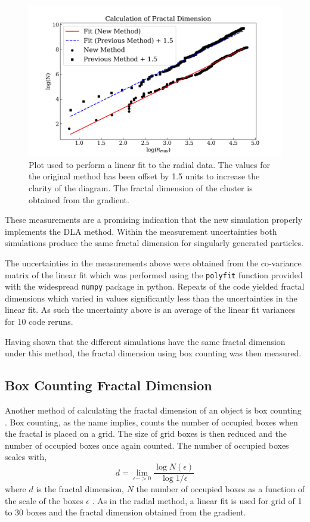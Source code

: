 \documentclass[%
 aapm,
 mph,%
 amsmath,amssymb,
 reprint,%
]{revtex4-2}
\begin{document}
\begin{figure}[h]
\centering
\includegraphics[width=\linewidth]{figures/1.png}
\caption{\label{fig:radial_dimension}Plot used to perform a linear fit to the radial data. The values for the original method has been offset by 1.5 units to increase the clarity of the diagram. The fractal dimension of the cluster is obtained from the gradient.}
\end{figure}
These measurements are a promising indication that the new simulation properly implements the DLA method. Within the measurement uncertainties both simulations produce the same fractal dimension for singularly generated particles.

The uncertainties in the measurements above were obtained from the co-variance matrix of the linear fit which was performed using the \verb+polyfit+ function provided with the widespread \verb+numpy+ package in python. Repeats of the code yielded fractal dimensions which varied in values significantly less than the uncertainties in the linear fit. As such the uncertainty above is an average of the linear fit variances for 10 code reruns.

Having shown that the different simulations have the same fractal dimension under this method, the fractal dimension using box counting was then measured.
\subsection{\label{sec:box_counting}Box Counting Fractal Dimension}
Another method of calculating the fractal dimension of an object is box counting \cite{FractalsBook}. Box counting, as the name implies, counts the number of occupied boxes when the fractal is placed on a grid. The size of grid boxes is then reduced and the number of occupied boxes once again counted. The number of occupied boxes scales with,
\begin{equation}
d = \lim_{\epsilon->0} \frac{ \log N(\epsilon) }{ \log 1/\epsilon }
\end{equation}
where $d$ is the fractal dimension, $N$ the number of occupied boxes as a function of the scale of the boxes $\epsilon$ \cite{FractalsBook,CompACoursework}. As in the radial method, a linear fit is used for grid of 1 to 30 boxes and the fractal dimension obtained from the gradient.
\end{document}
